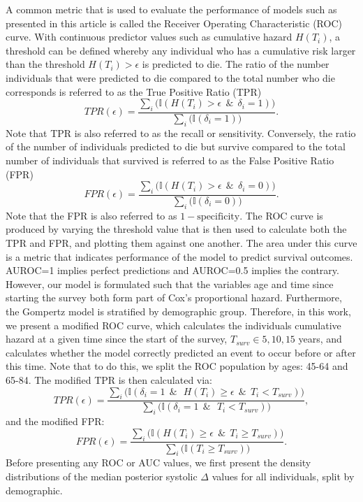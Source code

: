 \documentclass[
]{article}
\begin{document}
A common metric that is used to evaluate the performance of models such as presented in this article is called the Receiver Operating Characteristic (ROC) curve. With continuous predictor values such as cumulative hazard \(H(T_i)\), a threshold can be defined whereby any individual who has a cumulative risk larger than the threshold \(H(T_i)>\epsilon\) is predicted to die. The ratio of the number individuals that were predicted to die compared to the total number who die corresponds is referred to as the True Positive Ratio (TPR)
\begin{equation}
  TPR(\epsilon)=\frac{\sum_i\big(\mathbb{I}(H(T_i)>\epsilon \ \ \& \ \ \delta_i=1)\big)}{\sum_i\big(\mathbb{I}(\delta_i=1)\big)}.
\end{equation}
Note that TPR is also referred to as the recall or sensitivity. Conversely, the ratio of the number of individuals predicted to die but survive compared to the total number of individuals that survived is referred to as the False Positive Ratio (FPR)
\begin{equation}
  FPR(\epsilon)=\frac{\sum_i\big(\mathbb{I}(H(T_i)>\epsilon \ \ \& \ \ \delta_i=0)\big)}{\sum_i\big(\mathbb{I}(\delta_i=0)\big)}.
\end{equation}
Note that the FPR is also referred to as \(1-\mathrm{specificity}\). The ROC curve is produced by varying the threshold value that is then used to calculate both the TPR and FPR, and plotting them against one another. The area under this curve is a metric that indicates performance of the model to predict survival outcomes. AUROC=1 implies perfect predictions and AUROC=0.5 implies the contrary. However, our model is formulated such that the variables age and time since starting the survey both form part of Cox's proportional hazard. Furthermore, the Gompertz model is stratified by demographic group. Therefore, in this work, we present a modified ROC curve, which calculates the individuals cumulative hazard at a given time since the start of the survey, \(T_{surv} \in {5, 10, 15}\) years, and calculates whether the model correctly predicted an event to occur before or after this time. Note that to do this, we split the ROC population by ages: 45-64 and 65-84. The modified TPR is then calculated via:
\begin{equation}
  TPR(\epsilon)=\frac{\sum_i\big(\mathbb{I}(\delta_i=1 \ \ \& \ \ \ H(T_i)\geq \epsilon \ \ \& \ \ T_i<T_{surv})\big)}{\sum_i\big(\mathbb{I}(\delta_i=1 \ \ \& \ \ \ T_i<T_{surv})\big)},
\end{equation}
and the modified FPR:
\begin{equation}
  FPR(\epsilon)=\frac{\sum_i\big(\mathbb{I}(H(T_i)\geq \epsilon \ \ \& \ \ T_i\geq T_{surv})\big)}{\sum_i\big(\mathbb{I}(T_i\geq T_{surv})\big)}.
\end{equation}
Before presenting any ROC or AUC values, we first present the density distributions of the median posterior systolic \(\Delta\) values for all individuals, split by demographic.
\end{document}
